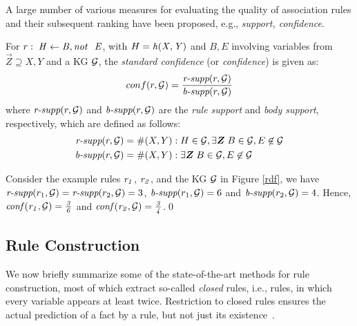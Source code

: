A large number of various measures for evaluating the quality of association rules and their subsequent ranking have been proposed, e.g., \emph{support, confidence}. 

For $r:\;\mi{H\leftarrow B, \naf\ E}$, with $H=\mathit{h(X,Y)}$ and $B,E$ involving variables from $\vec{Z}\supseteq X,Y$ and a KG $\mathcal{G}$, the \emph{standard confidence} (or \textit{confidence}) is given as:\vspace{-.26cm}
\begin{align*}
conf(r,\mathcal{G})= \frac{\textit{r-supp}(r,\mathcal{G})}{\textit{b-supp}(r,\mathcal{G})}
\end{align*}
where $\textit{r-supp}(r,\mathcal{G})$ and $\textit{b-supp}(r ,\mathcal{G})$ are the \textit{rule support} and \textit{body support}, respectively, which are defined as follows:
\begin{align*}
\textit{r-supp}(r,\cG) &= \#(X,Y): H \in \cG, \exists \vec{Z}\;B\in \cG,E \not \in \cG\\
\textit{b-supp}(r,\cG) &= \#(X,Y):\exists \vec{Z}\; B\in \cG, E \not \in \cG
\end{align*}
\begin{example}
Consider the example rules $\mathit{r_1}$, $\mathit{r_2}$, and the KG $\mathcal{G}$ in Figure \ref{rdf}, we have $\textit{r-supp}(r_1,\mathcal{G}) = \textit{r-supp}(r_2,\mathcal{G}) = 3$, $\textit{b-supp}(r_1,\mathcal{G}) = 6$ and $\textit{b-supp}(r_2,\mathcal{G}) = 4$.
Hence, $\mathit{conf(r_1,\mathcal{G}) = \frac{3}{6}}$ and $\mathit{conf(r_2,\mathcal{G}) = \frac{3}{4}}$.\qed
\end{example}

\subsection{Rule Construction}
\label{subsec:rule_const}

We now briefly summarize some of the state-of-the-art methods %
for rule construction, most of which %
extract so-called \emph{closed} rules,
i.e., rules, in which every variable appears at least twice. Restriction to closed rules %
ensures the actual prediction  of a fact by a rule, but not just its existence~\cite{amie}.

